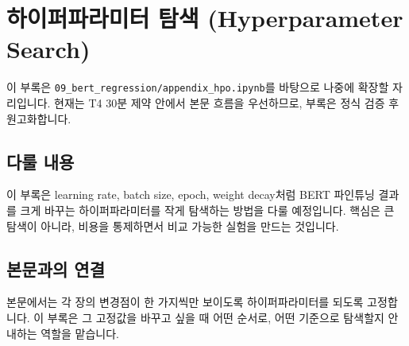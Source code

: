 \chapter{하이퍼파라미터 탐색 (Hyperparameter Search)}

\begin{noteBox}[부록 원고 상태]
이 부록은 \texttt{09\_bert\_regression/appendix\_hpo.ipynb}를 바탕으로 나중에 확장할 자리입니다. 현재는 T4 30분 제약 안에서 본문 흐름을 우선하므로, 부록은 정식 검증 후 원고화합니다.
\end{noteBox}

\section*{다룰 내용}

이 부록은 learning rate, batch size, epoch, weight decay처럼 BERT 파인튜닝 결과를 크게 바꾸는 하이퍼파라미터를 작게 탐색하는 방법을 다룰 예정입니다. 핵심은 큰 탐색이 아니라, 비용을 통제하면서 비교 가능한 실험을 만드는 것입니다.

\section*{본문과의 연결}

본문에서는 각 장의 변경점이 한 가지씩만 보이도록 하이퍼파라미터를 되도록 고정합니다. 이 부록은 그 고정값을 바꾸고 싶을 때 어떤 순서로, 어떤 기준으로 탐색할지 안내하는 역할을 맡습니다.

